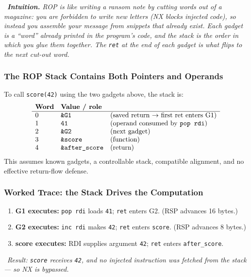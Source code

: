 \documentclass[hidelinks]{article}
\newcommand{\callout}[1]{\par\smallskip\noindent{\color{capri}$\blacktriangleright$}\ \textit{#1}\par\smallskip}
\begin{document}
\callout{\textbf{Intuition.} ROP is like writing a ransom note by cutting words out of a magazine: you are forbidden to \emph{write} new letters (NX blocks injected code), so instead you assemble your message from snippets that already exist. Each gadget is a ``word'' already printed in the program's code, and the stack is the order in which you glue them together. The \texttt{ret} at the end of each gadget is what flips to the next cut-out word.}

\subsubsection{The ROP Stack Contains Both Pointers and Operands}

To call \texttt{score(42)} using the two gadgets above, the stack is:
\[
\begin{array}{lll}
\textbf{Word} & \textbf{Value / role} & \\ \hline
0 & \texttt{\&G1} & \text{(saved return $\to$ first ret enters G1)}\\
1 & \texttt{41}   & \text{(operand consumed by \texttt{pop rdi})}\\
2 & \texttt{\&G2} & \text{(next gadget)}\\
3 & \texttt{\&score} & \text{(function)}\\
4 & \texttt{\&after\_score} & \text{(return)}\\
\end{array}
\]
This assumes known gadgets, a controllable stack, compatible alignment, and no effective return-flow defense.

\subsubsection{Worked Trace: the Stack Drives the Computation}

\begin{enumerate}
    \item \textbf{G1 executes:} \texttt{pop rdi} loads \texttt{41}; \texttt{ret} enters G2. (RSP advances 16 bytes.)
    \item \textbf{G2 executes:} \texttt{inc rdi} makes \texttt{42}; \texttt{ret} enters \texttt{score}. (RSP advances 8 bytes.)
    \item \textbf{score executes:} RDI supplies argument \texttt{42}; \texttt{ret} enters \texttt{after\_score}.
\end{enumerate}

\callout{Result: \texttt{score} receives \texttt{42}, and \emph{no injected instruction was fetched from the stack} --- so NX is bypassed.}
\end{document}

